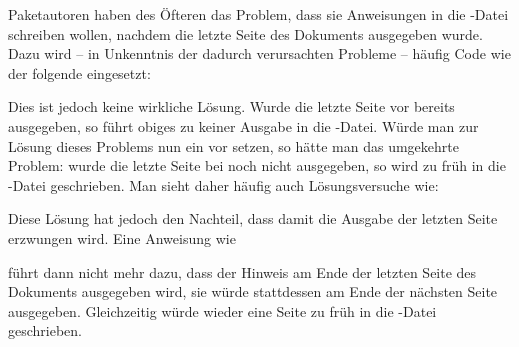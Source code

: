 \begin{Declaration}
\end{Declaration}
\iffalse%
Diese Anweisungen unterscheiden sich in einem Detail von den zuvor erklärten
Anweisungen. Jene ermöglichen Aktionen vor und nach dem Laden von Dateien. Das
ist hier nicht der Fall. %
\fi%
Paketautoren haben des Öfteren das Problem, dass sie Anweisungen in die
-Datei schreiben wollen, nachdem die letzte Seite des Dokuments
ausgegeben wurde. Dazu wird -- in Unkenntnis der dadurch verursachten Probleme
-- häufig Code wie der folgende eingesetzt:
\begin{lstcode}[escapechar=\$]
  \AtEndDocument{%
    \if@filesw
      \write\@auxout{\protect\writethistoaux}%
    \fi
  } 
\end{lstcode}
Dies ist jedoch keine wirkliche Lösung. Wurde die letzte
Seite vor  bereits ausgegeben, so führt obiges
zu keiner Ausgabe in die -Datei. Würde man zur Lösung dieses
Problems nun ein  vor  setzen, so hätte man das
umgekehrte Problem: wurde die letzte Seite bei
 noch nicht ausgegeben, so wird
 zu früh in die -Datei geschrieben. Man sieht
daher häufig auch Lösungsversuche wie:
\begin{lstcode}[escapechar=\$]
  \AtEndDocument{%
    \if@filesw
      \clearpage
      \immediate\write\@auxout{\protect\writethistoaux}%
    \fi
  } 
\end{lstcode}
Diese Lösung hat jedoch den Nachteil, dass damit die Ausgabe der letzten Seite
erzwungen wird. Eine Anweisung wie
\begin{lstcode}
\end{lstcode}
führt dann nicht mehr dazu, dass der Hinweis am Ende der letzten Seite des
Dokuments ausgegeben wird, sie würde stattdessen am Ende der nächsten Seite
ausgegeben. Gleichzeitig würde  wieder eine Seite zu
früh in die -Datei geschrieben.


